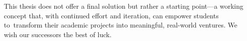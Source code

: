 This thesis does not offer a final solution but rather a starting point---a working concept that, with continued effort and iteration, can empower students to~transform their academic projects into meaningful, real-world ventures. We wish our successors the best of luck.

